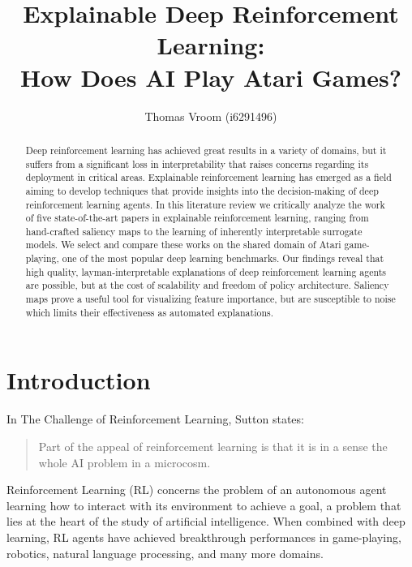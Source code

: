 \documentclass[sigconf]{acmart}
\title{Explainable Deep Reinforcement Learning:\\How Does AI Play Atari Games?}
\author{Thomas Vroom (i6291496)}
\begin{document}
%
%
\begin{abstract}
    Deep reinforcement learning has achieved great results in a variety of domains, but it suffers from a significant loss in interpretability that raises concerns regarding its deployment in critical areas.
    Explainable reinforcement learning has emerged as a field aiming to develop techniques that provide insights into the decision-making of deep reinforcement learning agents.
    In this literature review we critically analyze the work of five state-of-the-art papers in explainable reinforcement learning, ranging from hand-crafted saliency maps to the learning of inherently interpretable surrogate models.
    We select and compare these works on the shared domain of Atari game-playing, one of the most popular deep learning benchmarks.
    Our findings reveal that high quality, layman-interpretable explanations of deep reinforcement learning agents are possible, but at the cost of scalability and freedom of policy architecture.
    Saliency maps prove a useful tool for visualizing feature importance, but are susceptible to noise which limits their effectiveness as automated explanations.
\end{abstract}

\maketitle

%
%
\section{Introduction} \label{sec:introduction}
In The Challenge of Reinforcement Learning\cite{sutton1992introduction}, Sutton states:

\begin{quote}
    Part of the appeal of reinforcement learning is that it is in a sense the whole AI problem in a microcosm.
\end{quote}

Reinforcement Learning (RL) concerns the problem of an autonomous agent learning how to interact with its environment to achieve a goal, a problem that lies at the heart of the study of artificial intelligence\cite{sutton1992introduction,abel2023definition}.
When combined with deep learning, RL agents have achieved breakthrough performances in game-playing, robotics, natural language processing, and many more domains\cite{li2018deepreinforcementlearningoverview}.
\end{document}

